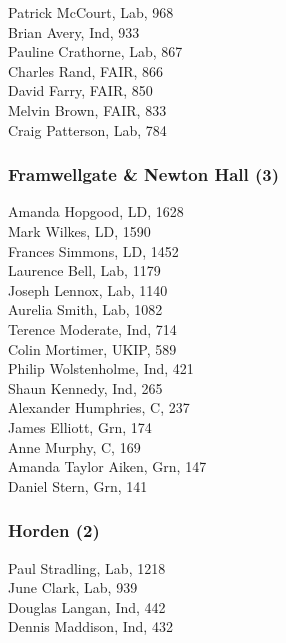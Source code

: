 \documentclass[a4paper,openany,10pt]{book}
\begin{document}


Patrick McCourt, Lab, 968\\
Brian Avery, Ind, 933\\
Pauline Crathorne, Lab, 867\\
Charles Rand, FAIR, 866\\
David Farry, FAIR, 850\\
Melvin Brown, FAIR, 833\\
Craig Patterson, Lab, 784\\


\subsubsection*{Framwellgate \& Newton Hall (3)}



Amanda Hopgood, LD, 1628\\
Mark Wilkes, LD, 1590\\
Frances Simmons, LD, 1452\\
Laurence Bell, Lab, 1179\\
Joseph Lennox, Lab, 1140\\
Aurelia Smith, Lab, 1082\\
Terence Moderate, Ind, 714\\
Colin Mortimer, UKIP, 589\\
Philip Wolstenholme, Ind, 421\\
Shaun Kennedy, Ind, 265\\
{Alexander Humphries}, C, 237\\
James Elliott, Grn, 174\\
Anne Murphy, C, 169\\
Amanda Taylor Aiken, Grn, 147\\
Daniel Stern, Grn, 141\\


\subsubsection*{Horden (2)}



Paul Stradling, Lab, 1218\\
June Clark, Lab, 939\\
Douglas Langan, Ind, 442\\
Dennis Maddison, Ind, 432\\
\end{document}
